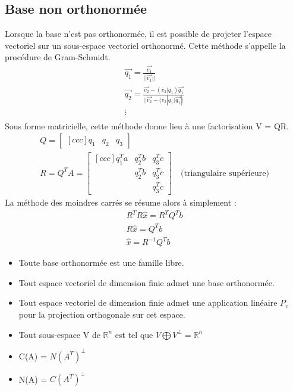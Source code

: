 \documentclass[a4paper]{book}
\begin{document}
\subsection{Base non orthonormée}
Lorsque la base n'est pas orthonormée, il est possible de projeter l'espace vectoriel sur un sous-espace vectoriel orthonormé. Cette méthode s'appelle la procédure de Gram-Schmidt. 
\begin{gather}
    \Vec{q_1} = \frac{\Vec{v_1}}{||\Vec{v_1}||} \\
    \Vec{q_2} = \frac{\Vec{v_2} - (v_2|q_1)\Vec{q_1}}{||\Vec{v_2} - (v_2|q_1)\Vec{q_1}||} \\
    \vdots \\
\end{gather}
Sous forme matricielle, cette méthode donne lieu à une factorisation V = QR. \\
\begin{gather}
    Q = \begin{bmatrix}[ccc]
    q_1&q_2&q_3
    \end{bmatrix}\\
    R = Q^TA =  \begin{bmatrix}[ccc]
    q_1^Ta&q_2^Tb&q_3^Tc\\
    &q_2^Tb&q_3^Tc\\
    &&q_3^Tc
    \end{bmatrix}
    \quad \text{(triangulaire supérieure)}
\end{gather}
La méthode des moindres carrés se résume alors à simplement : 
\begin{gather}
    R^TR\hat{x}=R^TQ^Tb \\
    R\hat{x}=Q^Tb \\
    \hat{x} = R^{-1}Q^Tb
\end{gather}
\begin{framed}
    \begin{itemize}
        \item Toute base orthonormée est une famille libre.
        \item Tout espace vectoriel de dimension finie admet une base orthonormée.
        \item Tout espace vectoriel de dimension finie admet une application linéaire $P_v$ pour la projection orthogonale sur cet espace.
        \item Tout sous-espace V de $\mathbb{R}^n$ est tel que $V \bigoplus V^\perp = \mathbb{R}^n$
        \item C(A) = $N(A^T)^\perp$
        \item N(A) = $C(A^T)^\perp$
    \end{itemize}
\end{framed}
\end{document}
